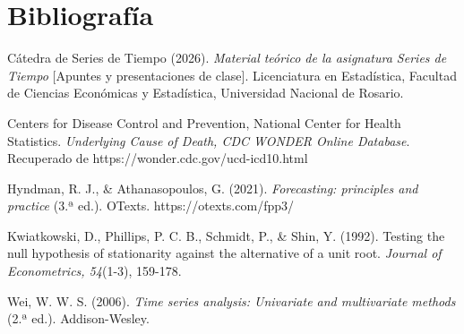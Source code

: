 \documentclass[
  spanish,
  11pt,
  letterpaper,
  DIV=11,
  numbers=noendperiod]{scrartcl}
\begin{document}
\section{Bibliografía}\label{bibliografuxeda}

Cátedra de Series de Tiempo (2026). \emph{Material teórico de la
asignatura Series de Tiempo} {[}Apuntes y presentaciones de clase{]}.
Licenciatura en Estadística, Facultad de Ciencias Económicas y
Estadística, Universidad Nacional de Rosario.

Centers for Disease Control and Prevention, National Center for Health
Statistics. \emph{Underlying Cause of Death, CDC WONDER Online
Database}. Recuperado de https://wonder.cdc.gov/ucd-icd10.html

Hyndman, R. J., \& Athanasopoulos, G. (2021). \emph{Forecasting:
principles and practice} (3.ª ed.). OTexts. https://otexts.com/fpp3/

Kwiatkowski, D., Phillips, P. C. B., Schmidt, P., \& Shin, Y. (1992).
Testing the null hypothesis of stationarity against the alternative of a
unit root. \emph{Journal of Econometrics, 54}(1-3), 159-178.

Wei, W. W. S. (2006). \emph{Time series analysis: Univariate and
multivariate methods} (2.ª ed.). Addison-Wesley.
\end{document}
